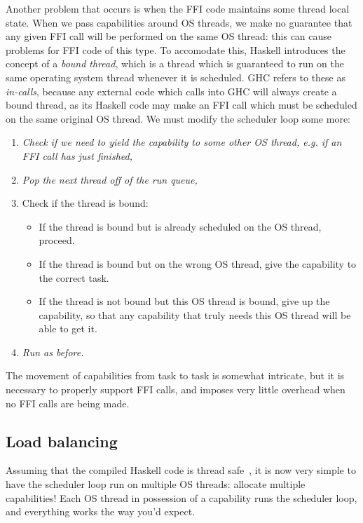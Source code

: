 Another problem that occurs is when the FFI code maintains some thread
local state.  When we pass capabilities around OS threads, we make no
guarantee that any given FFI call will be performed on the same OS
thread: this can cause problems for FFI code of this type.  To
accomodate this, Haskell introduces the concept of a \emph{bound
thread}, which is a thread which is guaranteed to run on the same
operating system thread whenever it is scheduled.  GHC refers to these
as \emph{in-calls}, because any external code which calls into GHC will
always create a bound thread, as its Haskell code may make an FFI call
which must be scheduled on the same original OS thread.  We must modify
the scheduler loop some more:

\begin{enumerate}
    \item \emph{Check if we need to yield the capability to some other OS thread, e.g. if an FFI call has just finished,}
    \item \emph{Pop the next thread off of the run queue,}
    \item Check if the thread is bound:
        \begin{itemize}
            \item If the thread is bound but is already scheduled on the OS thread, proceed.
            \item If the thread is bound but on the wrong OS thread, give the capability to the correct task.
            \item If the thread is not bound but this OS thread is bound, give up the capability, so that any capability that truly needs this OS thread will be able to get it.
        \end{itemize}
    \item \emph{Run as before.}
\end{enumerate}

The movement of capabilities from task to task is somewhat intricate,
but it is necessary to properly support FFI calls, and imposes very
little overhead when no FFI calls are being made.

\subsection{Load balancing}

Assuming that the compiled Haskell code is thread safe~\XXX, it is now
very simple to have the scheduler loop run on multiple OS threads:
allocate multiple capabilities!  Each OS thread in possession of a capability
runs the scheduler loop, and everything works the way you'd expect.

